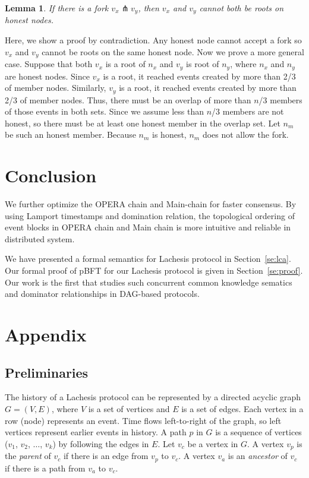 \documentclass{article}
\newtheorem{lem}[thm]{Lemma}
\newcommand{\efork}{\pitchfork}
\begin{document}
\begin{lem}
If there is a fork $v_x \efork  v_y$, then $v_x$ and $v_y$ cannot both be roots on honest nodes.
\end{lem}
Here, we show a proof by contradiction. Any honest node cannot accept a fork so $v_x$ and $v_y$ cannot be roots on the same honest node. Now we prove a more general case. Suppose that both $v_x$ is a root of $n_x$ and $v_y$ is root of $n_y$, where $n_x$ and $n_y$ are honest nodes. Since $v_x$ is a root, it reached events created by more than 2/3 of member nodes. Similarly, $v_y$ is a root, it reached events created by more than 2/3 of member nodes. Thus, there must be an overlap of more than $n$/3 members of those events in both sets. Since we assume less than $n$/3 members are not honest, so there must be at least one honest member in the overlap set. Let $n_m$ be such an honest member. Because $n_m$ is honest, $n_m$ does not allow the fork.

\section{Conclusion}\label{se:con}
We further optimize the OPERA chain and Main-chain for faster consensus. By using Lamport timestamps and domination relation, the topological ordering of event blocks in OPERA chain and Main chain is more intuitive and reliable in distributed system. 

We have presented a formal semantics for Lachesis protocol in Section~\ref{se:lca}.
Our formal proof of pBFT for our Lachesis protocol is given in Section~\ref{se:proof}.  Our work is the first that studies such concurrent common knowledge sematics~\cite{cck92} and dominator relationships in DAG-based protocols.

\newpage
\section{Appendix}\label{se:appendix}


\subsection{Preliminaries}
The history of a Lachesis protocol can be represented by a directed acyclic graph $G=(V, E)$, where $V$ is a set of vertices and $E$ is a set of edges. Each vertex in a row (node) represents an event. Time flows left-to-right of the graph, so left vertices represent earlier events in history.
A path $p$ in $G$ is a sequence  of vertices ($v_1$, $v_2$, $\dots$, $v_k$) by following the edges in $E$.
Let $v_c$ be a vertex in $G$.
A vertex $v_p$ is the \emph{parent} of $v_c$ if there is an edge from $v_p$ to $v_c$.
A vertex $v_a$ is an \emph{ancestor} of $v_c$ if there is a path from $v_a$ to $v_c$.
\end{document}
